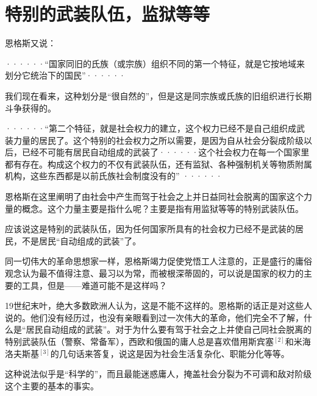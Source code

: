 \chapter{特别的武装队伍，监狱等等} %

恩格斯又说：
\pskip
\leftskip=10mm
\small

······“国家同旧的氏族（或宗族）组织不同的第一个特征，就是它按地域来划分它统治下的国民”······

\leftskip=0mm
\normalsize
\pskip

我们现在看来，这种划分是“很自然的”，但是这是同宗族或氏族的旧组织进行长期斗争获得的。

\pskip
\leftskip=10mm
\small

······“第二个特征，就是社会权力的建立，这个权力已经不是自己组织成武装力量的居民了。这个特别的社会权力之所以需要，是因为自从社会分裂成阶级以后，已经不可能有居民自动组成的武装了······\quad 这个社会权力在每一个国家里都有存在。构成这个权力的不仅有武装队伍，还有监狱、各种强制机关等物质附属机构，这些东西都是以前氏族社会制度没有的” ······

\leftskip=0mm
\normalsize
\pskip

恩格斯在这里阐明了由社会中产生而驾于社会之上并日益同社会脱离的国家这个力量的概念。这个力量主要是指什么呢？主要是指有用监狱等等的特别武装队伍。

应该说这是特别的武装队伍，因为任何国家所具有的社会权力已经不是武装的居民，不是居民“自动组成的武装”了。

同一切伟大的革命思想家一样，恩格斯竭力促使党悟工人注意的，正是盛行的庸俗观念认为最不值得注意、最习以为常，而被根深蒂固的，可以说是国家的权力的主要的工具，但是——难道可能不是这样吗？

19世纪末叶，绝大多数欧洲人认为，这是不能不这样的。恩格斯的话正是对这些人说的。他们没有经历过，也没有亲眼看到过一次伟大的革命，他们完全不了解，什么是“居民自动组成的武装”。对于为什么要有驾于社会之上并使自己同社会脱离的特别武装队伍（警察、常备军），西欧和俄国的庸人总是喜欢借用斯宾塞$^{[2]}$和米海洛夫斯基$^{[3]}$的几句话来答复，说这是因为社会生活复杂化、职能分化等等。

这种说法似乎是“科学的”，而且最能迷惑庸人，掩盖社会分裂为不可调和敌对阶级这个主要的基本的事实。

